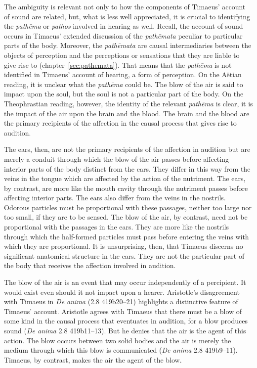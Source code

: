 The ambiguity is relevant not only to how the components of Timaeus' account of sound are related, but, what is less well appreciated, it is crucial to identifying the \emph{pathēma} or \emph{pathos} involved in hearing as well. Recall, the account of sound occurs in Timaeus' extended discussion of the \emph{pathēmata} peculiar to particular parts of the body. Moreover, the \emph{pathēmata} are causal intermediaries between the objects of perception and the perceptions or sensations that they are liable to give rise to (chapter~\ref{sec:pathemata}). That means that the \emph{pathēma} is not identified in Timaeus' account of hearing, a form of perception. On the Aëtian reading, it is unclear what the \emph{pathēma} could be. The blow of the air is said to impact upon the soul, but the soul is not a particular part of the body. On the Theophrastian reading, however, the identity of the relevant \emph{pathēma} is clear, it is the impact of the air upon the brain and the blood. The brain and the blood are the primary recipients of the affection in the causal process that gives rise to audition.

The ears, then, are not the primary recipients of the affection in audition but are merely a conduit through which the blow of the air passes before affecting interior parts of the body distinct from the ears. They differ in this way from the veins in the tongue which are affected by the action of the nutriment. The ears, by contrast, are more like the mouth cavity through the nutriment passes before affecting interior parts. The ears also differ from the veins in the nostrils. Odorous particles must be proportional with these passages, neither too large nor too small, if they are to be sensed. The blow of the air, by contrast, need not be proportional with the passages in the ears. They are more like the nostrils through which the half-formed particles must pass before entering the veins with which they are proportional. It is unsurprising, then, that Timaeus discerns no significant anatomical structure in the ears. They are not the particular part of the body that receives the affection involved in audition.

The blow of the air is an event that may occur independently of a percipient. It would exist even should it not impact upon a hearer. Aristotle's disagreement with Timaeus in \emph{De anima} (2.8 419b20--21) highlights a distinctive feature of Timaeus' account. Aristotle agrees with Timaeus that there must be a blow of some kind in the causal process that eventuates in audition, for a blow produces sound (\emph{De anima} 2.8 419b11--13). But he denies that the air is the agent of this action. The blow occurs between two solid bodies and the air is merely the medium through which this blow is communicated (\emph{De anima} 2.8 419b9--11). Timaeus, by contrast, makes the air the agent of the blow. 


